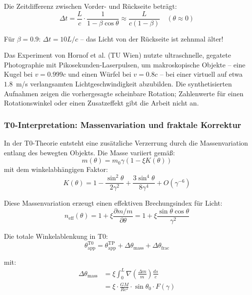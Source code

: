 	Die Zeitdifferenz zwischen Vorder- und Rückseite beträgt:
	\begin{equation}
		\Delta t = \frac{L}{c} \cdot \frac{1}{1-\beta\cos\theta} \approx \frac{L}{c(1-\beta)} \quad (\theta \approx 0)
	\end{equation}
	
	Für $\beta = 0.9$: $\Delta t = 10L/c$ – das Licht von der Rückseite ist zehnmal älter!
	
	Das Experiment von Hornof et al. (TU Wien) \cite{terrell2025} nutzte ultraschnelle, gegatete Photographie mit Pikosekunden-Laserpulsen, um makroskopische Objekte -- eine Kugel bei $v = 0.999c$ und einen Würfel bei $v = 0.8c$ -- bei einer virtuell auf etwa $1.8$~m/s verlangsamten Lichtgeschwindigkeit abzubilden. Die synthetisierten Aufnahmen zeigen die vorhergesagte scheinbare Rotation; Zahlenwerte für einen Rotationswinkel oder einen Zusatzeffekt gibt die Arbeit nicht an.
	
	\subsubsection{T0-Interpretation: Massenvariation und fraktale Korrektur}
	
	In der T0-Theorie entsteht eine zusätzliche Verzerrung durch die Massenvariation entlang des bewegten Objekts. Die Masse variiert gemäß:
	\begin{equation}
		m(\theta) = m_0\gamma\left(1 - \xi K(\theta)\right)
	\end{equation}
	mit dem winkelabhängigen Faktor:
	\begin{equation}
		K(\theta) = 1 - \frac{\sin^2\theta}{2\gamma^2} + \frac{3\sin^4\theta}{8\gamma^4} + O(\gamma^{-6})
	\end{equation}
	
	Diese Massenvariation erzeugt einen effektiven Brechungsindex für Licht:
	\begin{equation}
		n_{\text{eff}}(\theta) = 1 + \xi \frac{\partial m/m}{\partial \theta} = 1 + \xi \frac{\sin\theta\cos\theta}{\gamma^2}
	\end{equation}
	
	Die totale Winkelablenkung in T0:
	\begin{equation}
		\theta_{\text{app}}^{\text{T0}} = \theta_{\text{app}}^{\text{TP}} + \Delta\theta_{\text{mass}} + \Delta\theta_{\text{frac}}
	\end{equation}
	
	mit:
	\begin{align}
		\Delta\theta_{\text{mass}} &= \xi \int_0^L \nabla\left(\frac{\Delta m}{m}\right) \frac{ds}{c} \\
		&= \xi \cdot \frac{GM}{Rc^2} \cdot \sin\theta_0 \cdot F(\gamma)
	\end{align}
	
